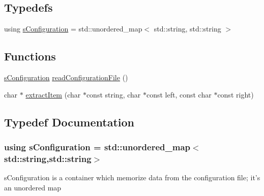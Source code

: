 \subsection*{Typedefs}
\begin{DoxyCompactItemize}
\item 
using \hyperlink{readConfigurationFile_8hh_ab8f35b1da3261263c5e9c0e7c8921f5c}{s\-Configuration} = std\-::unordered\-\_\-map$<$ std\-::string, std\-::string $>$
\end{DoxyCompactItemize}
\subsection*{Functions}
\begin{DoxyCompactItemize}
\item 
\hyperlink{readConfigurationFile_8hh_ab8f35b1da3261263c5e9c0e7c8921f5c}{s\-Configuration} \hyperlink{readConfigurationFile_8hh_a4e3ab429a1d72d0d31c7290c97731e1e}{read\-Configuration\-File} ()
\item 
char $\ast$ \hyperlink{readConfigurationFile_8hh_ae898d525eda0e47a85dcef4e60aa46ab}{extract\-Item} (char $\ast$const string, char $\ast$const left, const char $\ast$const right)
\end{DoxyCompactItemize}


\subsection{Typedef Documentation}
\hypertarget{readConfigurationFile_8hh_ab8f35b1da3261263c5e9c0e7c8921f5c}{
\subsubsection[{s\-Configuration}]{\setlength{\rightskip}{0pt plus 5cm}using {\bf s\-Configuration} =  std\-::unordered\-\_\-map$<$std\-::string,std\-::string$>$}}\label{readConfigurationFile_8hh_ab8f35b1da3261263c5e9c0e7c8921f5c}
s\-Configuration is a container which memorize data from the configuration file; it's an unordered map 

